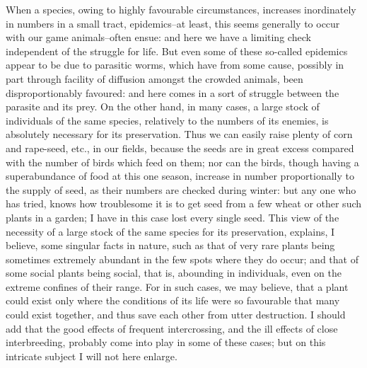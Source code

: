 When a species, owing to highly favourable circumstances, increases inordinately in numbers in a small tract, epidemics--at least, this seems generally to occur with our game animals--often ensue: and here we have a limiting check independent of the struggle for life. But even some of these so-called epidemics appear to be due to parasitic worms, which have from some cause, possibly in part through facility of diffusion amongst the crowded animals, been disproportionably favoured: and here comes in a sort of struggle between the parasite and its prey.
On the other hand, in many cases, a large stock of individuals of the same species, relatively to the numbers of its enemies, is absolutely necessary for its preservation. Thus we can easily raise plenty of corn and rape-seed, etc., in our fields, because the seeds are in great excess compared with the number of birds which feed on them; nor can the birds, though having a superabundance of food at this one season, increase in number proportionally to the supply of seed, as their numbers are checked during winter: but any one who has tried, knows how troublesome it is to get seed from a few wheat or other such plants in a garden; I have in this case lost every single seed. This view of the necessity of a large stock of the same species for its preservation, explains, I believe, some singular facts in nature, such as that of very rare plants being sometimes extremely abundant in the few spots where they do occur; and that of some social plants being social, that is, abounding in individuals, even on the extreme confines of their range. For in such cases, we may believe, that a plant could exist only where the conditions of its life were so favourable that many could exist together, and thus save each other from utter destruction. I should add that the good effects of frequent intercrossing, and the ill effects of close interbreeding, probably come into play in some of these cases; but on this intricate subject I will not here enlarge.
